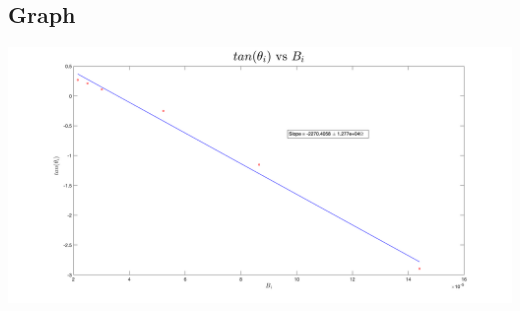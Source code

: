 \documentclass{article}
\begin{document}
\begin{center}
  \subsection*{Graph}
  \includegraphics[scale=0.25]{graph.png}
\end{center}
\end{document}
